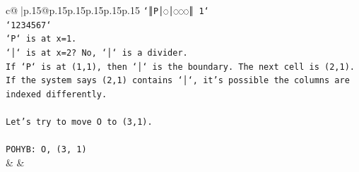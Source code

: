 \documentclass{article}
\begin{document}
{\begin{supertabular}{c@{$\;$}|p{.15\linewidth}@{}p{.15\linewidth}p{.15\linewidth}p{.15\linewidth}p{.15\linewidth}p{.15\linewidth}}
{{{\texttt{`║P│◌│◌◌◌║ 1`} \\
\texttt{`1234567`} \\
\texttt{`P` is at x=1.} \\
\texttt{`│` is at x=2? No, `│` is a divider.} \\
\texttt{If `P` is at (1,1), then `│` is the boundary. The next cell is (2,1).} \\
\texttt{If the system says (2,1) contains `│`, it's possible the columns are indexed differently.} \\
\\ 
\texttt{Let's try to move O to (3,1).} \\
\\ 
\texttt{POHYB: O, (3, 1)} \\
            }
        }
    }
    & & \\ \\


\end{supertabular}}
\end{document}
